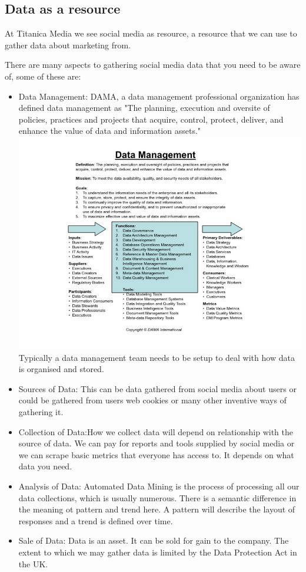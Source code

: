 \documentclass{article}
\begin{document}
\subsection{Data as a resource}
At Titanica Media we see social media as resource, a resource that we can use to gather data about marketing from.

There are many aspects to gathering social media data that you need to be aware of, some of these are:
\begin{itemize}
\item Data Management: DAMA, a data management professional organization has defined data management as "The planning, execution and oversite of policies, practices and projects that acquire, control, protect, deliver, and enhance the value of data and information assets." \cite{dama}\\
\includegraphics[scale=0.5]{datamanagement} \\
Typically a data management team needs to be setup to deal with how data is organised and stored. 
\item Sources of Data: This can be data gathered from social media about users or could be gathered from users web cookies or many other inventive ways of gathering it.
\item Collection of Data:How we collect data will depend on relationship with the source of data. We can pay for reports and tools supplied by social media or we can scrape basic metrics that everyone has access to. It depends on what data you need.
\item Analysis of Data: Automated Data Mining is the process of processing all our data collections, which is usually numerous. There is a semantic difference in the meaning ot pattern and trend here. A pattern will describe the layout of responses and a trend is defined over time.
\item Sale of Data: Data is an asset. It can be sold for gain to the company. The extent to which we may gather data is limited by the Data Protection Act in the UK.

\end{itemize}




\end{document}
